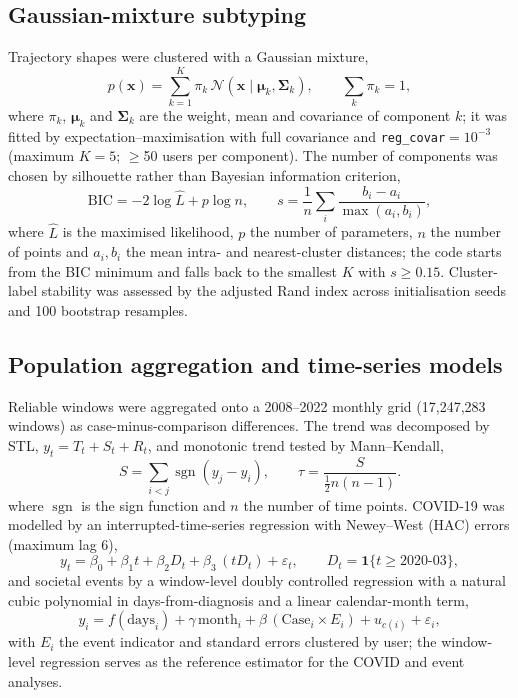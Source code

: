 \documentclass[11pt]{article}
\begin{document}
\subsection*{Gaussian-mixture subtyping}
Trajectory shapes were clustered with a Gaussian mixture,
\begin{equation}
p(\mathbf{x})=\sum_{k=1}^{K}\pi_k\,\mathcal{N}(\mathbf{x}\mid\boldsymbol{\mu}_k,\boldsymbol{\Sigma}_k),
\qquad \sum_k\pi_k=1,
\label{eq:gmm}
\end{equation}
where $\pi_k$, $\boldsymbol\mu_k$ and $\boldsymbol\Sigma_k$ are the weight, mean and covariance
of component $k$; it was fitted by expectation--maximisation \cite{dempster1977maximum} with full covariance and
\texttt{reg\_covar}$=10^{-3}$ (maximum $K=5$; $\ge$50 users per component). The number of
components was chosen by silhouette rather than Bayesian information criterion,
\begin{equation}
\mathrm{BIC}=-2\log\hat L+p\log n,
\qquad
s=\frac{1}{n}\sum_{i}\frac{b_i-a_i}{\max(a_i,b_i)},
\label{eq:bic}
\end{equation}
where $\hat L$ is the maximised likelihood, $p$ the number of parameters, $n$ the number of
points and $a_i,b_i$ the mean intra- and nearest-cluster distances; the code starts from
the BIC minimum and falls back to the smallest $K$ with $s\ge0.15$. Cluster-label stability was
assessed by the adjusted Rand index across initialisation seeds and 100 bootstrap resamples.

\subsection*{Population aggregation and time-series models}
Reliable windows were aggregated onto a 2008--2022 monthly grid (17{,}247{,}283 windows) as
case-minus-comparison differences. The trend was decomposed by STL,
$y_t=T_t+S_t+R_t$, and monotonic trend tested by Mann--Kendall,
\begin{equation}
S=\sum_{i<j}\operatorname{sgn}(y_j-y_i),\qquad
\tau=\frac{S}{\tfrac12 n(n-1)}.
\label{eq:mk}
\end{equation}
where $\operatorname{sgn}$ is the sign function and $n$ the number of time points.
COVID-19 was modelled by an interrupted-time-series regression with Newey--West (HAC) errors
(maximum lag 6),
\begin{equation}
y_t=\beta_0+\beta_1 t+\beta_2 D_t+\beta_3\,(t D_t)+\varepsilon_t,\qquad D_t=\mathbf{1}\{t\ge \text{2020-03}\},
\label{eq:its}
\end{equation}
and societal events by a window-level doubly controlled regression with a natural cubic
polynomial in days-from-diagnosis and a linear calendar-month term,
\begin{equation}
y_i=f(\text{days}_i)+\gamma\,\text{month}_i+\beta\,(\mathrm{Case}_i\times E_i)+u_{c(i)}+\varepsilon_i,
\label{eq:wlevel}
\end{equation}
with $E_i$ the event indicator and standard errors clustered by user; the window-level
regression serves as the reference estimator for the COVID and event analyses.
\end{document}
